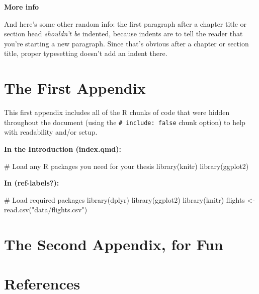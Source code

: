 \documentclass[
  letterpaper,
  12pt,
  twoside]{reedthesis}
\newenvironment{Shaded}{\begin{snugshade}}{\end{snugshade}}
\newcommand{\CommentTok}[1]{\textcolor[rgb]{0.37,0.37,0.37}{#1}}
\newcommand{\FunctionTok}[1]{\textcolor[rgb]{0.28,0.35,0.67}{#1}}
\newcommand{\NormalTok}[1]{\textcolor[rgb]{0.00,0.23,0.31}{#1}}
\newcommand{\OtherTok}[1]{\textcolor[rgb]{0.00,0.23,0.31}{#1}}
\newcommand{\StringTok}[1]{\textcolor[rgb]{0.13,0.47,0.30}{#1}}
\begin{document}
\textbf{More info}

And here's some other random info: the first paragraph after a chapter
title or section head \emph{shouldn't be} indented, because indents are
to tell the reader that you're starting a new paragraph. Since that's
obvious after a chapter or section title, proper typesetting doesn't add
an indent there.

\appendix


\chapter{The First Appendix}\label{the-first-appendix}

This first appendix includes all of the R chunks of code that were
hidden throughout the document (using the
\texttt{\#\textbar{}\ include:\ false} chunk option) to help with
readability and/or setup.

\textbf{In the Introduction (index.qmd):}

\begin{Shaded}
\begin{Highlighting}[]
\CommentTok{\# Load any R packages you need for your thesis}
\FunctionTok{library}\NormalTok{(knitr)}
\FunctionTok{library}\NormalTok{(ggplot2)}
\end{Highlighting}
\end{Shaded}

\textbf{In (\textbf{ref-labels?}):}

\begin{Shaded}
\begin{Highlighting}[]
\CommentTok{\# Load required packages}
\FunctionTok{library}\NormalTok{(dplyr)}
\FunctionTok{library}\NormalTok{(ggplot2)}
\FunctionTok{library}\NormalTok{(knitr)}
\NormalTok{flights }\OtherTok{\textless{}{-}} \FunctionTok{read.csv}\NormalTok{(}\StringTok{"data/flights.csv"}\NormalTok{)}
\end{Highlighting}
\end{Shaded}


\chapter{The Second Appendix, for
Fun}\label{the-second-appendix-for-fun}


\chapter*{References}\label{references}
\end{document}
